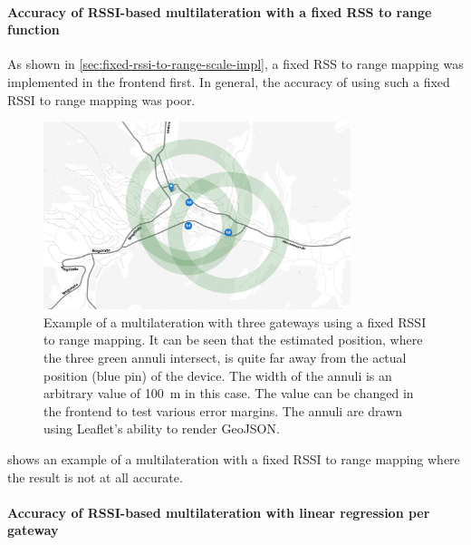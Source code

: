 \paragraph{Accuracy of \acs{RSSI}-based multilateration with a fixed \acs{RSS} to range function}\label{subsubsec:conclusion-rssi-fixed-scale}

As shown in \cref{sec:fixed-rssi-to-range-scale-impl}, a fixed \ac{RSS} to range mapping was implemented in the frontend first.
In general, the accuracy of using such a fixed \ac{RSSI} to range mapping was poor.

\begin{figure}[htbp]
    \centering
    \includegraphics[width=0.8\textwidth]{pictures/ttn-locator/frontend/multilateration/rssi_range_multilateration_bad_example.png}
    \caption{
        Example of a multilateration with three gateways using a fixed \ac{RSSI} to range mapping.
        It can be seen that the estimated position, where the three green annuli intersect, is quite far away from the actual position (blue pin) of the device.
        The width of the annuli is an arbitrary value of \SI{100}{\meter} in this case.
        The value can be changed in the frontend to test various error margins.
        The annuli are drawn using Leaflet's ability to render GeoJSON.
    }\label{pic:bad-rssi-to-range-multilateration-example}
\end{figure}

 shows an example of a multilateration with a fixed \ac{RSSI} to range mapping where the result is not at all accurate.

\paragraph{Accuracy of \acs{RSSI}-based multilateration with linear regression per gateway}\label{subsubsec:conclusion-rssi-linear-regression}

